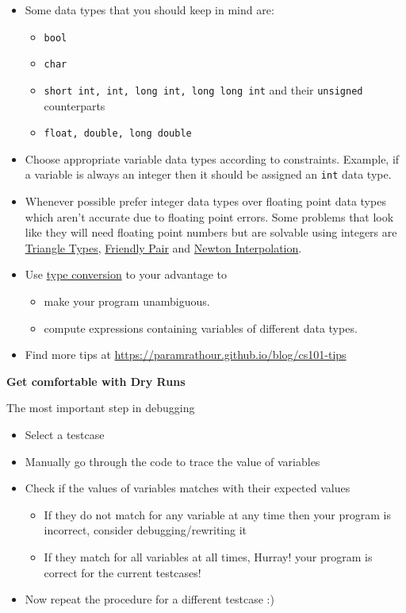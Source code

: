 \documentclass[../Problems]{subfiles}
\begin{document}
\begin{itemize}
\item Some data types that you should keep in mind are:
	\begin{itemize}
	\item \verb!bool!
	\item \verb!char!
	\item \verb!short int, int, long int, long long int! and their \verb!unsigned! counterparts
	\item \verb!float, double, long double!
	\end{itemize}
\item Choose appropriate variable data types according to constraints. Example, if a variable is always an integer then it should be assigned an \verb!int! data type.
\item Whenever possible prefer integer data types over floating point data types which aren't accurate due to floating point errors. Some problems that look like they will need floating point numbers but are solvable using integers are \hyperref[pp:triangletypes]{Triangle Types}, \hyperref[pp:friendlypair]{Friendly Pair} and \hyperref[pp:newtoninterpolation]{Newton Interpolation}.
\item Use \href{https://www.geeksforgeeks.org/type-conversion-in-c/}{type conversion} to your advantage to
	\begin{itemize}
	\item make your program unambiguous.
	\item compute expressions containing variables of different data types.
	\end{itemize}
\item Find more tips at \url{https://paramrathour.github.io/blog/cs101-tips}
\end{itemize}
\begin{center}
	\textbf{\large{Get comfortable with Dry Runs}}
\end{center}
The most important step in debugging
\begin{itemize}	
\item Select a testcase
\item Manually go through the code to trace the value of variables
\item Check if the values of variables matches with their expected values
\begin{itemize}
	\item If they do not match for any variable at any time then your program is incorrect, consider debugging/rewriting it
	\item If they match for all variables at all times, Hurray! your program is correct for the current testcases!
\end{itemize}
\item Now repeat the procedure for a different testcase :)
\end{itemize}
\end{document}
